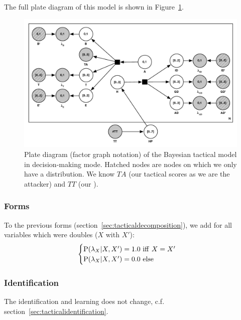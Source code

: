 The full plate diagram of this model is shown in Figure~\ref{fig:SpecialTacticsFull_plate}.
\begin{figure}[h]
\begin{center}
\includegraphics[width=15cm]{images/SpecialTacticsFull_plate.pdf}
\caption{Plate diagram (factor graph notation) of the Bayesian tactical model in decision-making mode. Hatched nodes are nodes on which we only have a distribution. We know $TA$ (our tactical scores as we are the attacker) and $TT$ (our ).}
\label{fig:SpecialTacticsFull_plate}
\end{center}
\end{figure}

\subsubsection{Forms}

To the previous forms (section~\ref{sec:tacticaldecomposition}), we add for all variables which were doubles ($X$ with $X'$):
\begin{eqnarray*}
\begin{cases}
\mathrm{P}(\lambda_{X}|X,X') = 1.0\ \mathrm{iff}\ X=X'\\
\mathrm{P}(\lambda_{X}|X,X') = 0.0\ \mathrm{else}
\end{cases}
\end{eqnarray*}
\subsubsection{Identification}
The identification and learning does not change, c.f. section~\ref{sec:tacticalidentification}.

